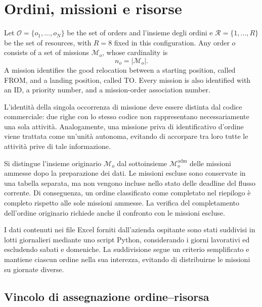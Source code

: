 \section{Ordini, missioni e risorse}
\label{sec:progetto-modello}

Let $\mathcal O=\{o_1,\ldots,o_N\}$ be the set of orders and l'insieme degli ordini e
$\mathcal R=\{1,\ldots,R\}$ be the set of resources, with $R=8$ fixed in this configuration. Any order $o$ consists of a set of missions $\mathcal M_o$, whose cardinality is
\begin{equation}
    n_o=|\mathcal M_o|.
\end{equation}
A mission identifies the good relocation between a starting position, called FROM, and a landing position, called TO. Every mission is also identified with an ID, a priority number, and a mission-order association number.

L'identità della singola occorrenza di missione deve essere distinta dal
codice commerciale: due righe con lo stesso codice non rappresentano
necessariamente una sola attività. Analogamente, una missione priva di
identificativo d'ordine viene trattata come un'unità autonoma, evitando di
accorpare tra loro tutte le attività prive di tale informazione.

Si distingue l'insieme originario $\mathcal M_o$ dal sottoinsieme
$\mathcal M_o^{\mathrm{adm}}$ delle missioni ammesse dopo la preparazione
dei dati. Le missioni escluse sono conservate in una tabella separata, ma
non vengono incluse nello stato delle deadline del flusso corrente.
Di conseguenza, un ordine classificato come completato nel riepilogo è
completo rispetto alle sole missioni ammesse. La verifica del completamento
dell'ordine originario richiede anche il confronto con le missioni escluse.


\begin{nota}
	I dati contenuti nei file Excel forniti dall'azienda ospitante sono stati
	suddivisi in lotti giornalieri mediante uno script Python, considerando
	i giorni lavorativi ed escludendo sabati e domeniche. La suddivisione
	segue un criterio semplificato e mantiene ciascun ordine nella sua
	interezza, evitando di distribuirne le missioni su giornate diverse.
\end{nota}


\subsection{Vincolo di assegnazione ordine--risorsa}

